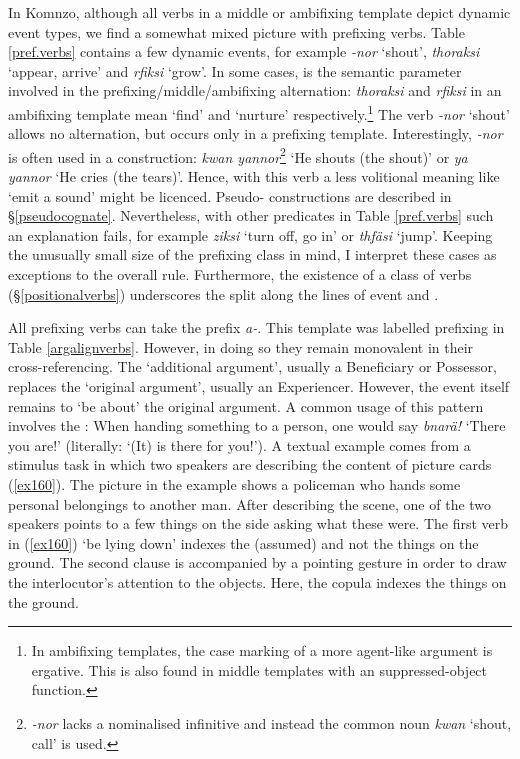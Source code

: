 In Komnzo, although all verbs in a middle or ambifixing template depict dynamic event types, we find a somewhat mixed picture with prefixing verbs. Table \ref{pref.verbs} contains a few dynamic events, for example \emph{-nor} `shout', \emph{thoraksi} `appear, arrive' and \emph{rfiksi} `grow'. In some cases,  is the semantic parameter involved in the prefixing/middle/ambifixing alternation: \emph{thoraksi} and \emph{rfiksi} in an ambifixing  template mean `find' and `nurture' respectively.\footnote{In ambifixing templates, the case marking of a more agent-like argument is ergative. This is also found in middle templates with an suppressed-object function.} The verb \emph{-nor} `shout' allows no alternation, but occurs only in a prefixing template. Interestingly, \emph{-nor} is often used in a  construction: \emph{kwan yannor}\footnote{\emph{-nor} lacks a nominalised infinitive and instead the common noun \emph{kwan} `shout, call' is used.} `He shouts (the shout)' or \emph{ya yannor} `He cries (the tears)'. Hence, with this verb a less volitional meaning like `emit a sound' might be licenced. Pseudo- constructions are described in \S{}\ref{pseudocognate}. Nevertheless, with other predicates in Table \ref{pref.verbs} such an explanation fails, for example \emph{ziksi} `turn off, go in' or \emph{thfäsi} `jump'. Keeping the unusually small size of the prefixing class in mind, I interpret these cases as exceptions to the overall rule. Furthermore, the existence of a class of  verbs (\S{}\ref{positionalverbs}) underscores the split along the lines of event  and .%

All prefixing verbs can take the  prefix \emph{a-}. This template was labelled  prefixing in Table \ref{argalignverbs}. However, in doing so they remain monovalent in their cross-referencing. The `additional argument', usually a Beneficiary or Possessor, replaces the `original argument', usually an Experiencer. However, the event itself remains to `be about' the original argument. A common usage of this pattern involves the : When handing something to a person, one would say \emph{bnarä!} `There you are!' (literally: `(It) is there for you!'). A textual example comes from a stimulus task in which two speakers are describing the content of picture cards (\ref{ex160}). The picture in the example shows a policeman who hands some personal belongings to another man. After describing the scene, one of the two speakers points to a few things on the side asking what these were. The first verb in (\ref{ex160}) `be lying down' indexes the (assumed)  and not the things on the ground. The second clause is accompanied by a pointing gesture in order to draw the interlocutor's attention to the objects. Here, the copula indexes the things on the ground.

